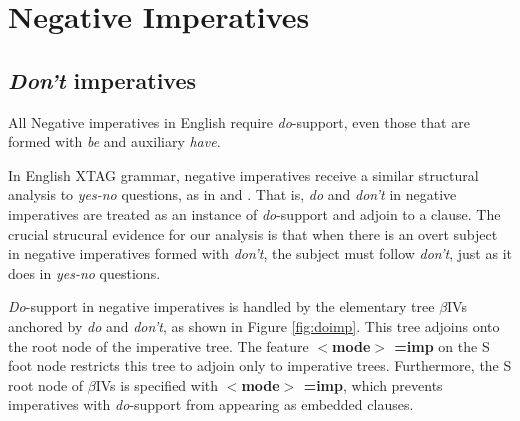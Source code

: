 {\beginsentences
{}\label{ex:294} 
\label{ex:295} 
\endsentences

 
 
\section{Negative Imperatives} 
\label{neg-imp} 
 
\subsection{{\it Don't} imperatives} 
 
All Negative imperatives in English require {\it do}-support, even those 
that are formed with {\it be} and auxiliary {\it have}. 
 
\beginsentences
{}\label{ex:296} 
\label{ex:297} 
\endsentences

 
\beginsentences
{}\label{ex:298} 
\label{ex:299} 
\endsentences

 
\beginsentences
{}\label{ex:300} 
\label{ex:301} 
\endsentences

 
\beginsentences
{}\label{ex:302} 
\label{ex:303} 
\endsentences

 
In English XTAG grammar, negative imperatives receive a similar structural analysis 
to {\it yes-no} questions, as in \cite{potsdamdiss97} and \cite{handiss}. 
That is, {\it do} and {\it don't} in negative imperatives are treated as an 
instance of {\it do}-support and adjoin to a clause.  The crucial 
strucural evidence for our analysis is that when there is an overt subject 
in negative imperatives formed with {\it don't}, the subject must follow 
{\it don't}, just as it does in {\it yes-no} questions. 
 
\beginsentences
{}\label{ex:304} 
\label{ex:305} 
\endsentences

 
\beginsentences
{}\label{ex:306} 
\label{ex:307} 
\endsentences

 
{\it Do}-support in negative imperatives is handled by the elementary tree 
$\beta$IVs anchored by {\it do} and {\it don't}, as shown in Figure 
\ref{fig:doimp}.  This tree adjoins onto the root node of the imperative 
tree.  The feature {\bf $<$mode$>$ =imp} on the S foot node restricts this 
tree to adjoin only to imperative trees. Furthermore, the S root node of 
$\beta$IVs is specified with {\bf $<$mode$>$ =imp}, which prevents 
imperatives with {\it do}-support from appearing as embedded clauses. 
 
}
